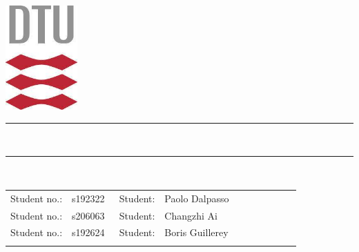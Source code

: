 \documentclass[10pt]{article}
\numberwithin{equation}{section}
\numberwithin{figure}{section}
\numberwithin{table}{section}
\begin{document}
\begin{center}
\includegraphics[height=4cm]{Figures/dtulogo.jpg}
\end{center}

\begin{center}
\vspace*{1.8cm}
\newcommand{\HRule}{\rule{\textwidth}{1mm}}
\HRule\\
[0cm] \linebreak 
\fontsize{16}{32}{\textbf{\\[10pt] }}
\HRule\\[0.5cm]
\renewcommand{\arraystretch}{1}

\vspace*{0.5cm}
\Large
\vspace*{0.5cm}


\begin{tabular}{l l l l}
\large{Student no.:{\ \ s192322\ }} & \large{Student:{\ \ Paolo Dalpasso\ \ \ \ \ \ \ \ \ }}\\
\large{Student no.:{\ \ s206063\ }} & \large{Student:{\ \ Changzhi Ai\ \ \ \ \ \ \ \ \ }}\\
\large{Student no.:{\ \ s192624\ }} & \large{Student:{\ \ Boris Guillerey\ \ \ \ \ \ \ \ \ }}\\
\vspace{1cm}
\end{tabular}\\ 

\end{center}

\setlength{\parindent}{5ex}

\pagebreak

\clearpage
\setcounter{page}{1}
\tableofcontents

\pagebreak

\end{document}

